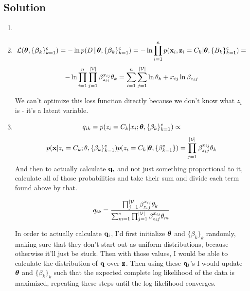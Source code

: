 \documentclass[submit]{harvardml}
\begin{document}
	\subsection*{Solution}
	
	\begin{enumerate}
		\item
		\begin{figure}
			\centering
		\end{figure}
		
		\item \[\mathcal{L}(\boldsymbol{\theta}, \{\boldsymbol{\beta}_k\}^c_{k=1}) =  
		-\ln p(D \,|\,\boldsymbol{\theta}, \{\boldsymbol{\beta}_k\}^c_{k=1}) = 
		-\ln \prod_{i = 1}^np(\mathbf{x}_i, \mathbf{z}_i = C_k | \boldsymbol{\theta}, \{B_k\}_{k=1}^c) = \]
		\[
		-\ln \displaystyle\prod_{i = 1}^{n}\prod_{j = 1}^{|\mathcal{V}|}\beta_{z_{ij}}^{x_{ij}}\theta_k =
		\sum_{i = 1}^{n}\sum_{j = 1}^{|\mathcal{V}|}\ln\theta_k+x_{ij}\ln\beta_{z_ij}\]
		
		We can't optimize this loss funciton directly because we don't know what $z_i$ is - it's a latent variable. 
		\item \[ q_{ik} = 
		p(z_i = C_k | x_i; \boldsymbol{\theta}, \{\beta_k\}_{k = 1}^c) \propto \]
		\[
		p(\mathbf{x} | z_i = C_k; \theta, \{\beta_k\}_{k=1}^c)p(z_i = C_k | \boldsymbol{\theta}, \{\beta_{k = 1}^c\}) = 
		\prod_{j = 1}^{|\mathcal{V}|}\beta_{z_ij}^{x_{ij}}\theta_k
		\]
		And then to actually calculate $\mathbf{q}_i$ and not just something proportional to it, calculate all of those probabilities and take their sum and divide each term found above by that.  
		
		\[
		q_{ik} = \dfrac{\prod_{j = 1}^{|\mathcal{V}|}\beta_{z_ij}^{x_{ij}}\theta_k}{\sum_{m=1}^{c}\prod_{j = 1}^{|\mathcal{V}|}\beta_{z_ij}^{x_{ij}}\theta_m}
		\]
		
		In order to actually calculate $\mathbf{q}_i$, I'd first initialize $\boldsymbol{\theta}$ and $\{\beta_k\}_k$ randomly, making sure that they don't start out as uniform distributions, because otherwise it'll just be stuck.  Then with those values, I would be able to calculate the distribution of $\mathbf{q}$ over $\mathbf{z}$.  Then using these $\mathbf{q}_i$'s I would update $\boldsymbol{\theta}$ and $\{\beta_k\}_k$ such that the expected complete log likelihood of the data is maximized, repeating these steps until the log likelihood converges.  
		

\end{enumerate}
\end{document}
